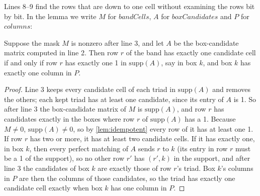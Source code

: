Lines 8--9 find the rows that are down to one cell without examining the rows bit by bit. In the lemma we write
$M$ for $\mathit{bandCells}$, $A$ for $\mathit{boxCandidates}$ and $P$ for $\mathit{columns}$:

\begin{lemma}
\label{lem:singlerows}
Suppose the mask $M$ is nonzero after line 3, and let $A$ be the box-candidate matrix computed in line 2. Then row $r$ of the
band has exactly one candidate cell if and only if row $r$ has exactly one 1 in $\mathrm{supp}(A)$, say in box $k$, and
box $k$ has exactly one column in $P$.
\end{lemma}
\begin{proof}
Line 3 keeps every candidate cell of each triad in $\mathrm{supp}(A)$ and removes the others; each kept triad has
at least one candidate, since its entry of $A$ is 1. So after line 3 the box-candidate matrix of $M$ is $\mathrm{supp}(A)$,
and row $r$ has candidates exactly in the boxes where row $r$ of $\mathrm{supp}(A)$ has a 1. Because $M\neq 0$,
$\mathrm{supp}(A)\neq 0$, so by \cref{lem:idempotent} every row of it has at least one 1. If row $r$ has two or more, it
has at least two candidate cells. If it has exactly one, in box $k$, then every perfect matching of $A$ sends $r$ to $k$
(its entry in row $r$ must be a 1 of the support), so no other row $r'$ has $(r',k)$ in the support, and after line 3
the candidates of box $k$ are exactly those of row $r$'s triad. Box $k$'s columns in $P$ are then the columns of
those candidates, so the triad has exactly one candidate cell exactly when box $k$ has one column in $P$.
\end{proof}

